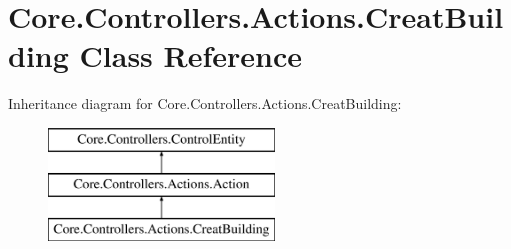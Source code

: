 \hypertarget{classCore_1_1Controllers_1_1Actions_1_1CreatBuilding}{\section{Core.\-Controllers.\-Actions.\-Creat\-Building Class Reference}
\label{classCore_1_1Controllers_1_1Actions_1_1CreatBuilding}
}
Inheritance diagram for Core.\-Controllers.\-Actions.\-Creat\-Building\-:\begin{figure}[H]
\begin{center}
\leavevmode
\includegraphics[height=3.000000cm]{classCore_1_1Controllers_1_1Actions_1_1CreatBuilding}
\end{center}
\end{figure}
